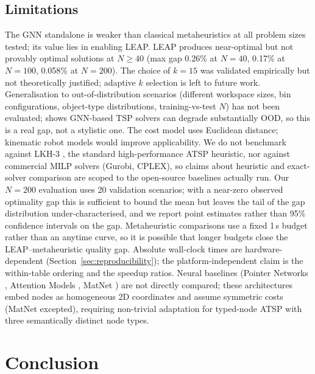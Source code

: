 \documentclass[conference]{IEEEtran}
\begin{document}
\subsection{Limitations}

The GNN standalone is weaker than classical metaheuristics at all problem sizes tested; its value lies in enabling LEAP. LEAP produces near-optimal but not provably optimal solutions at $N{\ge}40$ (max gap 0.26\% at $N{=}40$, 0.17\% at $N{=}100$, 0.058\% at $N{=}200$). The choice of $k{=}15$ was validated empirically but not theoretically justified; adaptive $k$ selection is left to future work. Generalisation to out-of-distribution scenarios (different workspace sizes, bin configurations, object-type distributions, training-vs-test $N$) has not been evaluated; \cite{joshi2021rethinking} shows GNN-based TSP solvers can degrade substantially OOD, so this is a real gap, not a stylistic one. The cost model uses Euclidean distance; kinematic robot models would improve applicability. We do not benchmark against LKH-3 \cite{helsgaun2000lkh}, the standard high-performance ATSP heuristic, nor against commercial MILP solvers (Gurobi, CPLEX), so claims about heuristic and exact-solver comparison are scoped to the open-source baselines actually run. Our $N{=}200$ evaluation uses 20 validation scenarios; with a near-zero observed optimality gap this is sufficient to bound the mean but leaves the tail of the gap distribution under-characterised, and we report point estimates rather than 95\% confidence intervals on the gap. Metaheuristic comparisons use a fixed 1\,s budget rather than an anytime curve, so it is possible that longer budgets close the LEAP--metaheuristic quality gap. Absolute wall-clock times are hardware-dependent (Section~\ref{sec:reproducibility}); the platform-independent claim is the within-table ordering and the speedup ratios. Neural baselines (Pointer Networks \cite{vinyals2015pointer}, Attention Models \cite{kool2019attention}, MatNet \cite{kwon2021matnet}) are not directly compared; these architectures embed nodes as homogeneous 2D coordinates and assume symmetric costs (MatNet excepted), requiring non-trivial adaptation for typed-node ATSP with three semantically distinct node types.

\section{Conclusion}\label{sec:conclusion}
\end{document}
